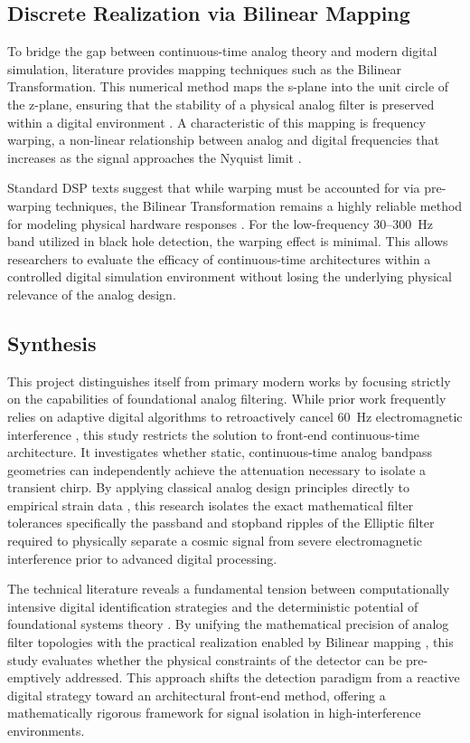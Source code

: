 \subsection{Discrete Realization via Bilinear Mapping}
To bridge the gap between continuous-time analog theory and modern digital simulation, literature provides mapping techniques such as the Bilinear Transformation. This numerical method maps the s-plane into the unit circle of the z-plane, ensuring that the stability of a physical analog filter is preserved within a digital environment \cite{5}. A characteristic of this mapping is frequency warping, a non-linear relationship between analog and digital frequencies that increases as the signal approaches the Nyquist limit \cite{5, 8}.

Standard DSP texts suggest that while warping must be accounted for via pre-warping techniques, the Bilinear Transformation remains a highly reliable method for modeling physical hardware responses \cite{4, 8}. For the low-frequency 30--300~Hz band utilized in black hole detection, the warping effect is minimal. This allows researchers to evaluate the efficacy of continuous-time architectures \cite{3} within a controlled digital simulation environment without losing the underlying physical relevance of the analog design.

\subsection{Synthesis}
This project distinguishes itself from primary modern works by focusing strictly on the capabilities of foundational analog filtering. While prior work frequently relies on adaptive digital algorithms to retroactively cancel 60~Hz electromagnetic interference \cite{1}, this study restricts the solution to front-end continuous-time architecture. It investigates whether static, continuous-time analog bandpass geometries can independently achieve the attenuation necessary to isolate a transient chirp. By applying classical analog design principles \cite{3} directly to empirical strain data \cite{1}, this research isolates the exact mathematical filter tolerances specifically the passband and stopband ripples of the Elliptic filter required to physically separate a cosmic signal from severe electromagnetic interference prior to advanced digital processing.

The technical literature reveals a fundamental tension between computationally intensive digital identification strategies \cite{1, 10} and the deterministic potential of foundational systems theory \cite{2}. By unifying the mathematical precision of analog filter topologies \cite{3, 9} with the practical realization enabled by Bilinear mapping \cite{5}, this study evaluates whether the physical constraints of the detector can be pre-emptively addressed. This approach shifts the detection paradigm from a reactive digital strategy toward an architectural front-end method, offering a mathematically rigorous framework for signal isolation in high-interference environments.